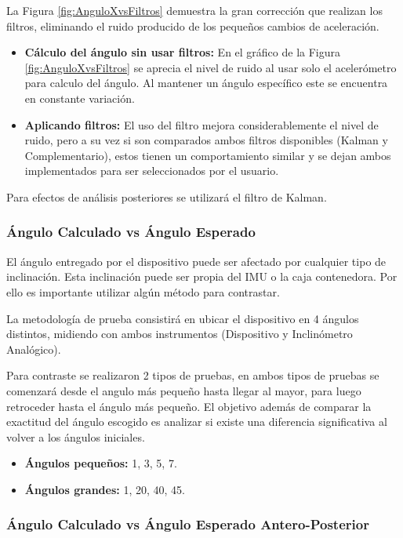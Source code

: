\documentclass[12pt,a4paper]{article}
\begin{document}
La Figura \ref{fig:AnguloXvsFiltros} demuestra la gran corrección que realizan los filtros, eliminando el ruido producido de los pequeños cambios de aceleración.
\begin{itemize}
	\item \textbf{Cálculo del ángulo sin usar filtros:} En el gráfico de la Figura \ref{fig:AnguloXvsFiltros} se aprecia el nivel de ruido al usar solo el acelerómetro para calculo del ángulo. Al mantener un ángulo específico este se encuentra en constante variación.
	\item \textbf{Aplicando filtros:} El uso del filtro mejora considerablemente el nivel de ruido, pero a su vez si son comparados ambos filtros disponibles (Kalman y Complementario), estos tienen un comportamiento similar y se dejan ambos implementados para ser seleccionados por el usuario.
\end{itemize}
Para efectos de análisis posteriores se utilizará el filtro de Kalman.

\newpage
\subsubsection{Ángulo Calculado vs Ángulo Esperado}
El ángulo entregado por el dispositivo puede ser afectado por cualquier tipo de inclinación. Esta inclinación puede ser propia del IMU o la caja contenedora.  Por ello es importante utilizar algún método para contrastar.


La metodología de prueba consistirá en ubicar el dispositivo en 4 ángulos distintos, midiendo con ambos instrumentos (Dispositivo y Inclinómetro Analógico).


Para contraste se realizaron 2 tipos de pruebas, en ambos tipos de pruebas se comenzará desde el angulo más pequeño hasta llegar al mayor, para luego retroceder hasta el ángulo más pequeño. El objetivo además de comparar la exactitud del ángulo escogido es analizar si existe una diferencia significativa al volver a los ángulos iniciales.

\begin{itemize}
	\item \textbf{Ángulos pequeños: }1, 3, 5, 7.
	\item \textbf{Ángulos grandes: }1, 20, 40, 45.
\end{itemize}



\subsubsection{Ángulo Calculado vs Ángulo Esperado Antero-Posterior}
\end{document}
